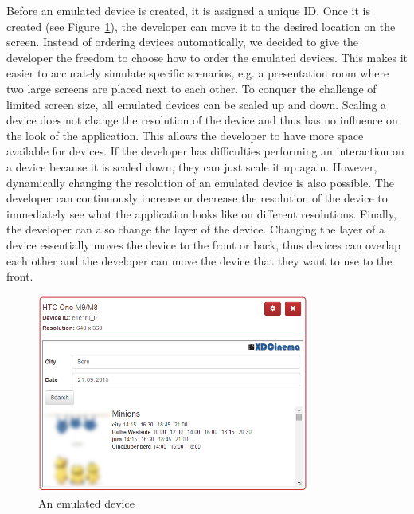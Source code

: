 Before an emulated device is created, it is assigned a unique ID. Once it is created (see Figure~\ref{fig:emulated_device}), the developer can move it to the desired location on the screen. Instead of ordering devices automatically, we decided to give the developer the freedom to choose how to order the emulated devices. This makes it easier to accurately simulate specific scenarios, e.g. a presentation room where two large screens are placed next to each other. To conquer the challenge of limited screen size, all emulated devices can be scaled up and down. Scaling a device does not change the resolution of the device and thus has no influence on the look of the application. This allows the developer to have more space available for devices. If the developer has difficulties performing an interaction on a device because it is scaled down, they can just scale it up again. However, dynamically changing the resolution of an emulated device is also possible. The developer can continuously increase or decrease the resolution of the device to immediately see what the application looks like on different resolutions. Finally, the developer can also change the layer of the device. Changing the layer of a device essentially moves the device to the front or back, thus devices can overlap each other and the developer can move the device that they want to use to the front.

\begin{figure}[H]
  \centering
    \includegraphics[width=0.8\textwidth]{images/screenshots/emulated_device_3.png}
	\caption[Screenshot: Emulated device]{An emulated device}
	\label{fig:emulated_device}
\end{figure}

